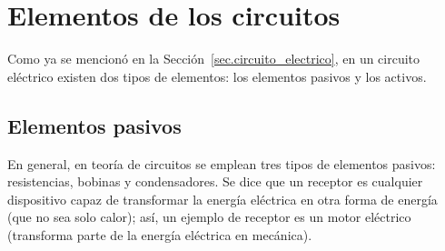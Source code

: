 	\section{Elementos de los circuitos}
	Como ya se mencionó en la
        Sección~\ref{sec.circuito_electrico}, en un circuito eléctrico
        existen dos tipos de elementos: los elementos pasivos y los
        activos.
	
	\subsection{Elementos pasivos}
	
	En general, en teoría de circuitos se emplean tres tipos de
        elementos pasivos: resistencias, bobinas y condensadores. Se
        dice que un receptor es cualquier dispositivo capaz de
        transformar la energía eléctrica en otra forma de energía (que
        no sea solo calor); así, un ejemplo de receptor es un motor
        eléctrico (transforma parte de la energía eléctrica en
        mecánica).
	

